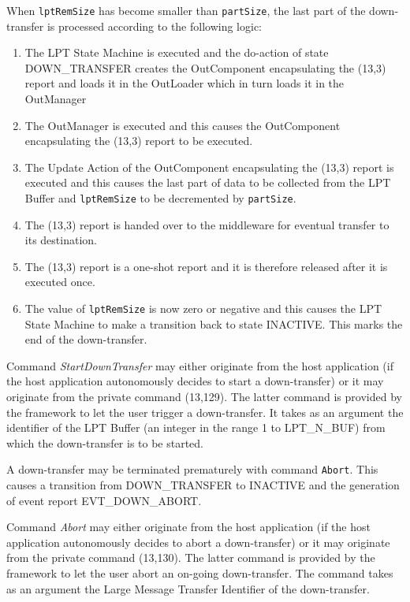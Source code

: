 \documentclass{pnp_article}
\begin{document}
When \texttt{lptRemSize} has become smaller than \texttt{partSize}, the last part of the down-transfer is processed according to the following logic:

\begin{enumerate}
\item The LPT State Machine is executed and the do-action of state DOWN\_TRANSFER creates the OutComponent encapsulating the (13,3) report and loads it in the OutLoader which in turn loads it in the OutManager
\item The OutManager is executed and this causes the OutComponent encapsulating the (13,3) report to be executed.
\item The Update Action of the OutComponent encapsulating the (13,3) report is executed and this causes the last part of data to be collected from the LPT Buffer and \texttt{lptRemSize} to be decremented by \texttt{partSize}.
\item The (13,3) report is handed over to the middleware for eventual transfer to its destination.
\item The (13,3) report is a one-shot report and it is therefore released after it is executed once.
\item The value of \texttt{lptRemSize} is now zero or negative and this causes the LPT State Machine to make a transition back to state INACTIVE. This marks the end of the down-transfer.
\end{enumerate}

Command \textit{StartDownTransfer} may either originate from the host application (if the host application autonomously decides to start a down-transfer) or it may originate from the private command (13,129). The latter command is provided by the framework to let the user trigger a down-transfer. It takes as an argument the identifier of the LPT Buffer (an integer in the range 1 to LPT\_N\_BUF) from which the down-transfer is to be started.

A down-transfer may be terminated prematurely with command \texttt{Abort}. This causes a transition from DOWN\_TRANSFER to INACTIVE and the generation of event report EVT\_DOWN\_ABORT.

Command \textit{Abort} may either originate from the host application (if the host application autonomously decides to abort a down-transfer) or it may originate from the private command (13,130). The latter command is provided by the framework to let the user abort an on-going down-transfer. The command takes as an argument the Large Message Transfer Identifier of the down-transfer. 
\end{document}
